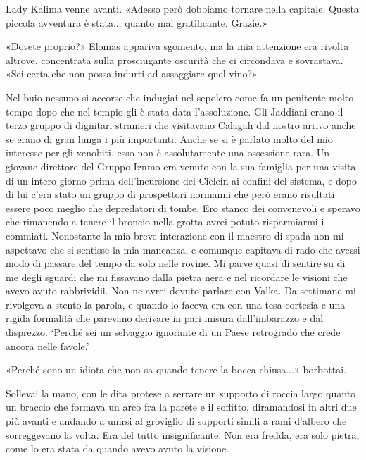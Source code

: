 Lady Kalima venne avanti. «Adesso però dobbiamo tornare nella capitale.
Questa piccola avventura è stata... quanto mai gratificante. Grazie.»

«Dovete proprio?» Elomas appariva sgomento, ma la mia attenzione era
rivolta altrove, concentrata sulla prosciugante oscurità che ci
circondava e sovrastava. «Sei certa che non possa indurti ad assaggiare
quel vino?»

\begin{figure}
	\centering
	\def\svgwidth{\columnwidth}
	\scalebox{0.2}{}
\end{figure}

Nel buio nessuno si accorse che indugiai nel sepolcro come fa un
penitente molto tempo dopo che nel tempio gli è stata data
l'assoluzione. Gli Jaddiani erano il terzo gruppo di dignitari stranieri
che visitavano Calagah dal nostro arrivo anche se erano di gran lunga i
più importanti. Anche se si è parlato molto del mio interesse per gli
xenobiti, esso non è assolutamente una ossessione rara. Un giovane
direttore del Gruppo Izumo era venuto con la sua famiglia per una visita
di un intero giorno prima dell'incursione dei Cielcin ai confini del
sistema, e dopo di lui c'era stato un gruppo di prospettori normanni che
però erano risultati essere poco meglio che depredatori di tombe. Ero
stanco dei convenevoli e speravo che rimanendo a tenere il broncio nella
grotta avrei potuto risparmiarmi i commiati. Nonostante la mia breve
interazione con il maestro di spada non mi aspettavo che si sentisse la
mia mancanza, e comunque capitava di rado che avessi modo di passare del
tempo da solo nelle rovine. Mi parve quasi di sentire su di me degli
sguardi che mi fissavano dalla pietra nera e nel ricordare le visioni
che avevo avuto rabbrividii. Non ne avrei dovuto parlare con Valka. Da
settimane mi rivolgeva a stento la parola, e quando lo faceva era con
una tesa cortesia e una rigida formalità che parevano derivare in pari
misura dall'imbarazzo e dal disprezzo. `Perché sei un selvaggio
ignorante di un Paese retrogrado che crede ancora nelle favole.'

«Perché sono un idiota che non sa quando tenere la bocca chiusa...»
borbottai.

Sollevai la mano, con le dita protese a serrare un supporto di roccia
largo quanto un braccio che formava un arco fra la parete e il soffitto,
diramandosi in altri due più avanti e andando a unirsi al groviglio di
supporti simili a rami d'albero che sorreggevano la volta. Era del tutto
insignificante. Non era fredda, era solo pietra, come lo era stata da
quando avevo avuto la visione.

